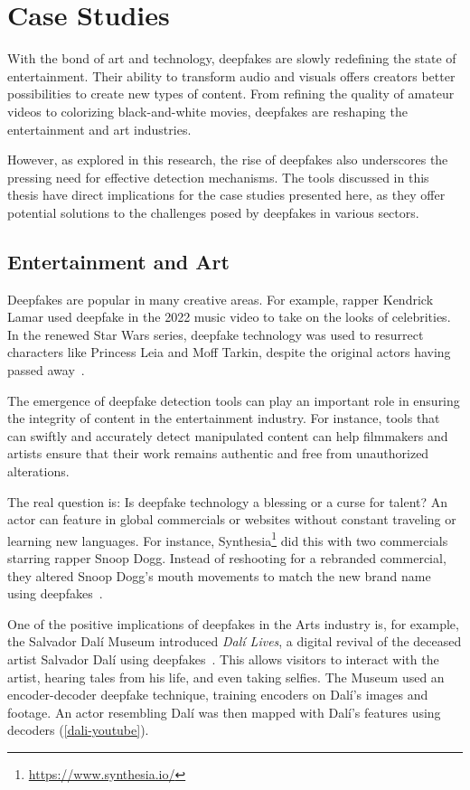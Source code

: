 
\chapter{Case Studies}\label{chapter:applications}
With the bond of art and technology, deepfakes are slowly redefining the state of
entertainment. Their ability to transform audio and visuals offers creators better
possibilities to create new types of content. From refining the quality of amateur
videos to colorizing black-and-white movies, deepfakes are reshaping the entertainment
and art industries.

However, as explored in this research, the rise of deepfakes also underscores the pressing
need for effective detection mechanisms. The tools discussed in this thesis have direct
implications for the case studies presented here, as they offer potential solutions
to the challenges posed by deepfakes in various sectors.


\section{Entertainment and Art}
Deepfakes are popular in many creative areas. For example, rapper Kendrick Lamar
used deepfake in the 2022 music video to take on the looks of celebrities. In the
renewed Star Wars series, deepfake technology was used to resurrect characters like
Princess Leia and Moff Tarkin, despite the original actors having passed away~\cite{motion-analysis}.

The emergence of deepfake detection tools can play an important role in ensuring the
integrity of content in the entertainment industry. For instance, tools that can swiftly
and accurately detect manipulated content can help filmmakers and artists ensure that
their work remains authentic and free from unauthorized alterations.

The real question is: Is deepfake technology a blessing or a curse for talent?
An actor can feature in global commercials or websites
without constant traveling or learning new languages. For instance, Synthesia\footnote{\url{https://www.synthesia.io/}}
did this with two commercials starring rapper Snoop Dogg. Instead of reshooting for a
rebranded commercial, they altered Snoop Dogg's mouth movements to match the new brand
name using deepfakes~\cite{wipo-magazine}.

One of the positive implications of deepfakes in the Arts industry is, for example, the Salvador
Dalí Museum introduced \textit{Dalí Lives}, a digital revival of the deceased artist
Salvador Dalí using deepfakes~\cite{salvador-dali, salvador-dali2}.
This allows visitors to interact with the artist, hearing tales from his life, and
even taking selfies. The Museum used an encoder-decoder deepfake technique, training encoders on Dalí's
images and footage. An actor resembling Dalí was then mapped with Dalí's features using
decoders (\autoref{dali-youtube}).


